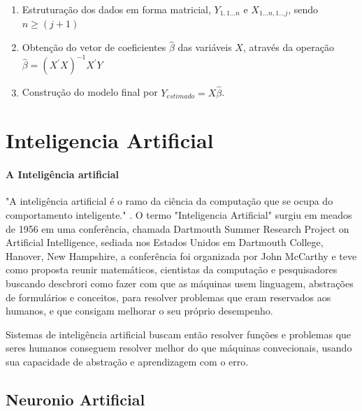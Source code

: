 \documentclass[	12pt, Times, openright, twoside, a4paper, english, brazil]{abntex2}
\begin{document}
            \begin{enumerate}
                  \item Estruturação dos dados em forma matricial, $Y_{1,1...n}$ e $X_{1...n,1...j}$, sendo $n \geq (j+1)$ \\
                  \item Obtenção do vetor de coeficientes $\widehat{\beta}$ das variáveis $X$, através da operação $\widehat{\beta}=(X^\prime X)^{-1} X^\prime Y$
                  \item Construção do modelo final por $Y_{estimado} = X\widehat{\beta}$.
            \end{enumerate}
      \section{Inteligencia Artificial}
        \paragraph*{A Inteligência artificial} "A inteligência artificial é o ramo da ciência da computação que se ocupa do comportamento inteligente." \cite{Luger2004}.
          O termo "Inteligencia Artificial" surgiu em meados de 1956 em uma conferência, chamada Dartmouth Summer Research Project on Artificial Intelligence, sediada nos Estados Unidos em Dartmouth College, Hanover, New Hampshire, a conferência foi organizada por John McCarthy e teve como proposta reunir matemáticos, cientistas da computação e pesquisadores buscando descbrori como fazer com que as máquinas usem linguagem, abstrações de formulários e conceitos, para resolver problemas que eram reservados aos humanos, e que consigam melhorar o seu próprio desempenho.

          Sistemas de inteligência artificial buscam então resolver funções e problemas que seres humanos conseguem resolver melhor do que máquinas convecionais, usando sua capacidade de abstração e aprendizagem com o erro.

        \subsection{Neuronio Artificial}
         
\end{document}

